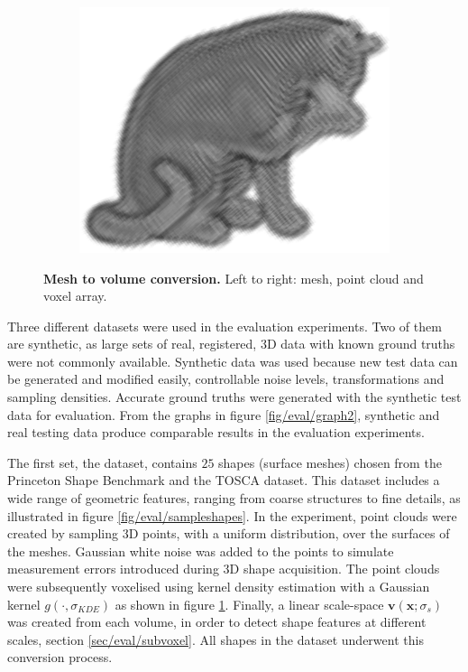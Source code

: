 \begin{figure}[ht]
	\begin{subfigure}[t]{0.31\linewidth} \centering 
		\includegraphics[height=0.85\linewidth]{./fig/eval/cat_volume.png}
	\end{subfigure}
	\caption{\textbf{Mesh to volume conversion.} Left to right: mesh, point cloud and voxel array.} 
	\label{fig/eval/vol_conversion}
\end{figure}

Three different datasets were used in the evaluation experiments. Two of them are synthetic, as large sets of real, registered, 3D data with known ground truths were not commonly available. Synthetic data was used because new test data can be generated and modified easily, \eg controllable noise levels, transformations and sampling densities. Accurate ground truths were generated with the synthetic test data for evaluation.  
From the graphs in figure \ref{fig/eval/graph2}, synthetic and real testing data produce comparable results in the evaluation experiments. 

The first set, the \meshset dataset, contains $25$ shapes (surface meshes) chosen from the Princeton Shape Benchmark \cite{Shilane2004} and the TOSCA \cite{Bronstein2008} dataset. 
This dataset includes a wide range of geometric features, ranging from coarse structures to fine details, as illustrated in figure \ref{fig/eval/sampleshapes}. In the experiment, point clouds were created by sampling 3D points, with a uniform distribution, over the surfaces of the meshes. Gaussian white noise was added to the points to simulate measurement errors introduced during 3D shape acquisition. 
The point clouds were subsequently voxelised using kernel density estimation with a Gaussian kernel $g(\cdot,\sigma_{KDE})$ as shown in figure \ref{fig/eval/vol_conversion}.
Finally, a linear scale-space $\mathbf{v}(\mathbf{x};\sigma_s)$ was created from each volume, in order to detect shape features at different scales, \cf section \ref{sec/eval/subvoxel}. All shapes in the dataset underwent this conversion process. 

